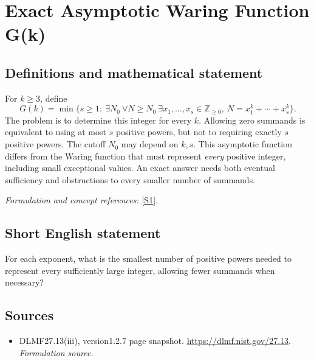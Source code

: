 \documentclass[11pt]{article}
\begin{document}
\section*{\texorpdfstring{Exact Asymptotic Waring Function G(k)}{Exact Asymptotic Waring Function G(k)}}\label{statement}
\subsection{Definitions and mathematical statement}
For $k\ge3$, define
\[
 G(k)=\min\{s\ge1:\ \exists N_0\ \forall N\ge N_0\
 \exists x_1,\ldots,x_s\in{\mathbb{Z}}_{\ge0},\ N=x_1^k+\cdots+x_s^k\}.
\]
The problem is to determine this integer for every $k$. Allowing zero summands is equivalent to using at most $s$ positive powers, but not to requiring exactly $s$ positive powers. The cutoff $N_0$ may depend on $k,s$. This asymptotic function differs from the Waring function that must represent \emph{every} positive integer, including small exceptional values. An exact answer needs both eventual sufficiency and obstructions to every smaller number of summands.
\par\smallskip\textit{Formulation and concept references:} \href{https://dlmf.nist.gov/27.13}{[S1]}.

\subsection{Short English statement}
For each exponent, what is the smallest number of positive powers needed to represent every sufficiently large integer, allowing fewer summands when necessary?
\subsection{Sources}
\begin{itemize}
\item[S1]DLMF27.13(iii), version1.2.7 page snapshot.
\url{https://dlmf.nist.gov/27.13}.
\textit{Formulation source.}
\end{itemize}
\end{document}
